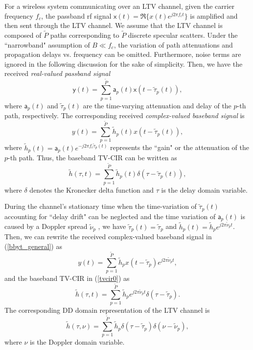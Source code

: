 \documentclass[journal]{IEEEtran}
\newcommand{\add}[1]{\textcolor{blue}{#1}}
\begin{document}
For a wireless system communicating over an LTV channel, given the carrier frequency $f_c$, the passband \ac{rf} signal $\mathsf x(t)=\Re\{x(t)e^{j2\pi f_c t}\}$ is amplified and then sent through the LTV channel. We assume that the LTV channel is composed of $\tilde P$ paths corresponding to $\tilde P$ discrete specular scatters. Under the ``narrowband" assumption of $B\ll f_c$,  the variation of path attenuations and propagation delays vs. frequency can be omitted. Furthermore, noise terms are ignored in the following discussion for the sake of simplicity. Then, we have the received \emph{real-valued passband signal}\cite{fwc}
\begin{equation}
  \mathsf y(t)=\sum_{p=1}^{\tilde P} {\mathsf a}_p(t)\mathsf x(t-\tilde \tau_p(t)),
\end{equation}
where ${\mathsf a}_p(t)$ and $\tilde \tau_p(t)$ are the time-varying attenuation and delay of the $p$-th path, respectively.
The corresponding received \emph{complex-valued baseband signal} is
\begin{equation}\label{bbyt_general}
  y(t)=\sum_{p=1}^{\tilde P}\tilde h_p(t) x(t-\tilde \tau_p(t)),
\end{equation}
where $\tilde h_p(t)={\mathsf a}_p(t)e^{-j2\pi f_c \tilde \tau_p(t)}$ represents the ``gain" or the attenuation
of the $p$-th path.
Thus, the baseband TV-CIR can be written as
\begin{equation}\label{tvcir0}
  \tilde h(\tau,t)=\sum_{p=1}^{\tilde P}\tilde h_p(t) \delta (\tau-\tilde \tau_p(t)),
\end{equation}
where $\delta$ denotes the Kronecker delta function and $\tau$ is the delay domain variable.

During the channel's stationary time when the time-variation of $\tilde \tau_p(t)$ accounting for ``delay drift" can be neglected and the time variation of ${\mathsf a}_p(t)$ is caused by a Doppler spread $\tilde \nu_p$ \cite{Hlawatsch2011}, we have $\tilde \tau_p(t)=\tilde \tau_p$ and
$\tilde h_p(t)=\tilde h_p e^{j2\pi \tilde \nu_p t}$. Then, we can rewrite the received complex-valued baseband signal in (\ref{bbyt_general}) as
\begin{equation}\label{bbyt}
  y(t)=\sum_{p=1}^{\tilde P}\tilde h_p x(t-\tilde \tau_p)e^{j2\pi \tilde \nu_p t},
\end{equation}
and the baseband TV-CIR in (\ref{tvcir0}) as
\begin{equation}\label{tvcir}
  \tilde h(\tau,t)=\sum_{p=1}^{\tilde P}\tilde h_p e^{j2\pi \tilde \nu_p t} \delta (\tau-\tilde \tau_p).
\end{equation}
The corresponding DD domain representation of the LTV channel is
\begin{equation}\label{sf}
  \tilde h(\tau,\nu)=\sum_{p=1}^{\tilde P}\tilde h_p \delta (\tau-\tilde\tau_p)\delta (\nu-\tilde\nu_p),
\end{equation}
where $\nu$ is the Doppler domain variable.
\end{document}
